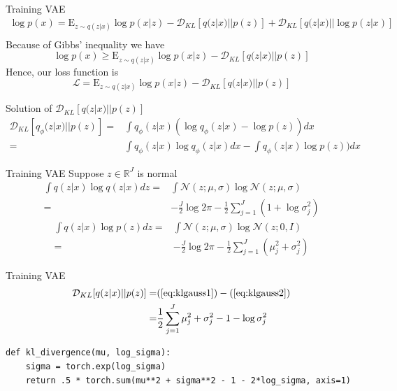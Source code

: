 \documentclass{beamer}
\newcommand{\real}{\mathbb{R}}
\newcommand{\kldiv}{\mathcal{D}_{KL}}
\newcommand{\E}{\mathrm{E}}
\begin{document}
\begin{frame}{Training VAE}
	\small
	\begin{equation}
	\begin{split}
		\log p(x) = \E_{z\sim q(z|x)}\log p(x|z)- \kldiv[q(z|x)||p(z)] + \kldiv[q(z|x)||\log p(z|x)]\\
	\end{split}
	\end{equation}
	\normalsize
	Because of Gibbs' inequality we have
	\[
		\log p(x)  \geq \E_{z\sim q(z|x)}\log p(x|z)- \kldiv[q(z|x)||p(z)]
	\]
	Hence, our loss function is
	\[
		\mathcal{L} = \E_{z\sim q(z|x)}\log p(x|z)- \kldiv[q(z|x)||p(z)]
	\]
\end{frame}

\begin{frame}{Solution of $\kldiv[q(z|x)||p(z)]$}
	\begin{equation*}
	\begin{split}
		\kldiv[q_\phi(z|x)||p(z)] 
		=& \int q_\phi(z|x)(\log q_\phi(z|x)-\log p(z))dx\\
		=& \int q_\phi(z|x)\log q_\phi(z|x)dx-\int q_\phi(z|x)\log p(z))dx
	\end{split}
	\end{equation*}
\end{frame}

\begin{frame}{Training VAE}
	Suppose $z\in \real^J$ is normal 
	\begin{equation}
	\begin{split}
		\int q(z|x)\log q(z|x)dz =& \int \mathcal{N}(z;\mu, \sigma)\log \mathcal{N}(z;\mu, \sigma)\\
		=& -\frac{J}{2} \log 2\pi - \frac{1}{2}\sum_{j=1}^J (1+\log \sigma_j^2)
		\end{split}
		\label{eq:klgauss1}
	\end{equation}
	\begin{equation}
	\begin{split}
		\int q(z|x)\log p(z)dz =& \int \mathcal{N}(z;\mu, \sigma)\log \mathcal{N}(z;0, I)\\
		=& -\frac{J}{2} \log 2\pi - \frac{1}{2}\sum_{j=1}^J (\mu_j^2+\sigma_j^2)
		\end{split}
		\label{eq:klgauss2}
	\end{equation}
\end{frame}

\begin{frame}[fragile]{Training VAE}
	\begin{equation}
	\begin{split}
		\kldiv[q(z|x)||p(z)] =& (\ref{eq:klgauss1})-(\ref{eq:klgauss2})\\
		=& \frac{1}{2}\sum_{j=1}^J \mu_j^2 + \sigma_j^2 - 1 - \log \sigma_j^2
	\end{split}
	\end{equation}
\begin{verbatim}
def kl_divergence(mu, log_sigma):
    sigma = torch.exp(log_sigma)
    return .5 * torch.sum(mu**2 + sigma**2 - 1 - 2*log_sigma, axis=1)
\end{verbatim}
\end{frame}
\end{document}
